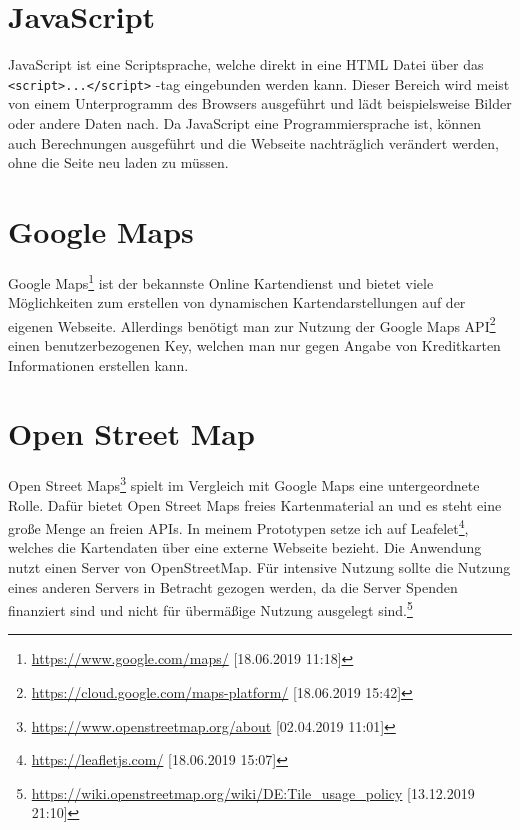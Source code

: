 \documentclass[a4paper, 12pt]{scrreprt}
\begin{document}
\section{JavaScript}
JavaScript ist eine Scriptsprache, welche direkt in eine HTML Datei über das \verb+<script>...</script>+ -tag eingebunden werden kann.
Dieser Bereich wird meist von einem Unterprogramm des Browsers ausgeführt und lädt beispielsweise Bilder oder andere Daten nach.
Da JavaScript eine Programmiersprache ist, können auch Berechnungen ausgeführt und die Webseite nachträglich verändert werden, ohne die Seite neu laden zu müssen.\cite{javascriptreferenz}
\section{Google Maps}
Google Maps\footnote{\url{https://www.google.com/maps/} [18.06.2019 11:18]} ist der bekannste Online Kartendienst und bietet viele Möglichkeiten zum erstellen von dynamischen Kartendarstellungen auf der eigenen Webseite.
Allerdings benötigt man zur Nutzung der Google Maps API\footnote{\url{https://cloud.google.com/maps-platform/} [18.06.2019 15:42]} einen benutzerbezogenen Key, welchen man nur gegen Angabe von Kreditkarten Informationen erstellen kann.
\section{Open Street Map}
Open Street Maps\footnote{\url{https://www.openstreetmap.org/about}  [02.04.2019 11:01]} spielt im Vergleich mit Google Maps eine untergeordnete Rolle.
Dafür bietet Open Street Maps freies Kartenmaterial an und es steht eine große Menge an freien APIs.
In meinem Prototypen setze ich auf Leafelet\footnote{\url{https://leafletjs.com/} [18.06.2019 15:07]}, welches die Kartendaten über eine externe Webseite bezieht.
Die Anwendung nutzt einen Server von OpenStreetMap.
Für intensive Nutzung sollte die Nutzung eines anderen Servers in Betracht gezogen werden, da die Server Spenden finanziert sind und nicht für übermäßige Nutzung ausgelegt sind.\footnote{\url{https://wiki.openstreetmap.org/wiki/DE:Tile_usage_policy} [13.12.2019 21:10]}
\end{document}
